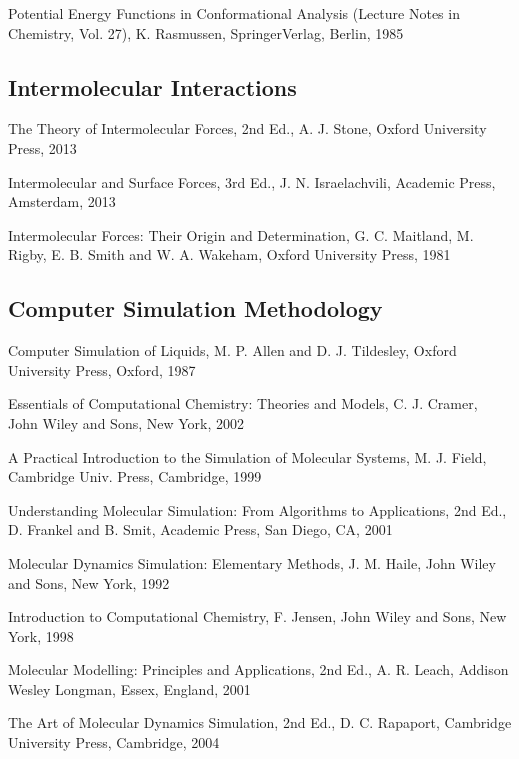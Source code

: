 \documentclass[letterpaper,11pt,english]{sphinxmanual}
\begin{document}
\sphinxAtStartPar
Potential Energy Functions in Conformational Analysis (Lecture Notes in Chemistry, Vol. 27), K. Rasmussen, Springer\sphinxhyphen{}Verlag, Berlin, 1985


\subsection{Intermolecular Interactions}
\label{\detokenize{text/references:intermolecular-interactions}}
\sphinxAtStartPar
The Theory of Intermolecular Forces, 2nd Ed., A. J. Stone, Oxford University Press, 2013

\sphinxAtStartPar
Intermolecular and Surface Forces, 3rd Ed., J. N. Israelachvili, Academic Press, Amsterdam, 2013

\sphinxAtStartPar
Intermolecular Forces: Their Origin and Determination, G. C. Maitland, M. Rigby, E. B. Smith and W. A. Wakeham, Oxford University Press, 1981


\subsection{Computer Simulation Methodology}
\label{\detokenize{text/references:computer-simulation-methodology}}
\sphinxAtStartPar
Computer Simulation of Liquids, M. P. Allen and D. J. Tildesley, Oxford University Press, Oxford, 1987

\sphinxAtStartPar
Essentials of Computational Chemistry: Theories and Models, C. J. Cramer, John Wiley and Sons, New York, 2002

\sphinxAtStartPar
A Practical Introduction to the Simulation of Molecular Systems, M. J. Field, Cambridge Univ. Press, Cambridge, 1999

\sphinxAtStartPar
Understanding Molecular Simulation: From Algorithms to Applications, 2nd Ed., D. Frankel and B. Smit, Academic Press, San Diego, CA, 2001

\sphinxAtStartPar
Molecular Dynamics Simulation: Elementary Methods, J. M. Haile, John Wiley and Sons, New York, 1992

\sphinxAtStartPar
Introduction to Computational Chemistry, F. Jensen, John Wiley and Sons, New York, 1998

\sphinxAtStartPar
Molecular Modelling: Principles and Applications, 2nd Ed., A. R. Leach, Addison Wesley Longman, Essex, England, 2001

\sphinxAtStartPar
The Art of Molecular Dynamics Simulation, 2nd Ed., D. C. Rapaport, Cambridge University Press, Cambridge, 2004
\end{document}
